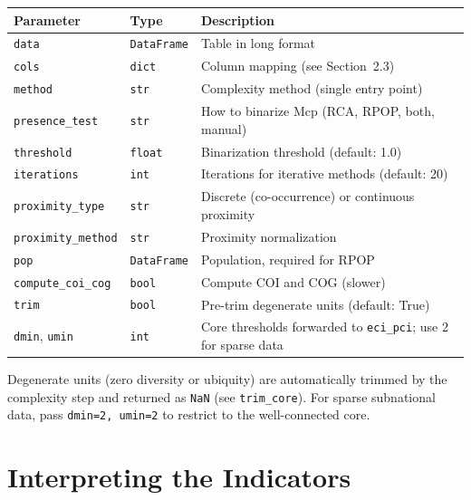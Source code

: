 \documentclass[12pt, a4paper]{article}
\newcommand{\fn}[1]{\texttt{#1}}
\begin{document}
\begin{center}
\renewcommand{\arraystretch}{1.3}
\begin{tabular}{llp{7cm}}
\toprule
\textbf{Parameter} & \textbf{Type} & \textbf{Description} \\
\midrule
\texttt{data}            & \texttt{DataFrame} & Table in long format \\
\texttt{cols}            & \texttt{dict}      & Column mapping (see Section~2.3) \\
\texttt{method}          & \texttt{str}       & Complexity method (single entry point) \\
\texttt{presence\_test}  & \texttt{str}       & How to binarize Mcp (RCA, RPOP, both, manual) \\
\texttt{threshold}       & \texttt{float}     & Binarization threshold (default: 1.0) \\
\texttt{iterations}      & \texttt{int}       & Iterations for iterative methods (default: 20) \\
\texttt{proximity\_type} & \texttt{str}       & Discrete (co-occurrence) or continuous proximity \\
\texttt{proximity\_method} & \texttt{str}     & Proximity normalization \\
\texttt{pop}             & \texttt{DataFrame} & Population, required for RPOP \\
\texttt{compute\_coi\_cog} & \texttt{bool}    & Compute COI and COG (slower) \\
\texttt{trim}            & \texttt{bool}      & Pre-trim degenerate units (default: True) \\
\texttt{dmin}, \texttt{umin} & \texttt{int}   & Core thresholds forwarded to \fn{eci\_pci}; use 2 for sparse data \\
\bottomrule
\end{tabular}
\end{center}

\begin{notebox}
  Degenerate units (zero diversity or ubiquity) are automatically
  trimmed by the complexity step and returned as \texttt{NaN}
  (see \fn{trim\_core}). For sparse subnational data, pass
  \texttt{dmin=2, umin=2} to restrict to the well-connected core.
\end{notebox}

\section{Interpreting the Indicators}
\end{document}

